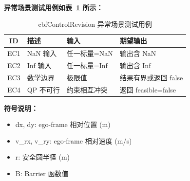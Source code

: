 \documentclass[a4paper,10pt]{article}
\begin{document}
\noindent\textbf{异常场景测试用例如表~\ref{tab:abnormal_cbfControlRevision} 所示：}
\begin{table}[h]
\centering
\caption{cbfControlRevision 异常场景测试用例}
\label{tab:abnormal_cbfControlRevision}
\begin{tabular}{|c|p{3.5cm}|p{3.5cm}|p{3.5cm}|}
\hline
ID & 描述 & 输入 & 期望输出 \\ \hline
  EC1 & NaN 输入 & 任一标量=NaN & 输出含 NaN \\ \hline
  EC2 & Inf 输入 & 任一标量=Inf & 输出含 Inf \\ \hline
  EC3 & 数学边界 & 极限值 & 结果有界或返回 false \\ \hline
  EC4 & QP 不可行 & 约束相互冲突 & 返回 feasible=false \\ \hline
\end{tabular}
\end{table}

\noindent\textbf{符号说明：}
\begin{itemize}
  \item dx, dy: ego-frame 相对位置 (m)
  \item v\_rx, v\_ry: ego-frame 相对速度 (m/s)
  \item r: 安全圆半径 (m)
  \item B: Barrier 函数值
\end{itemize}
\end{document}
